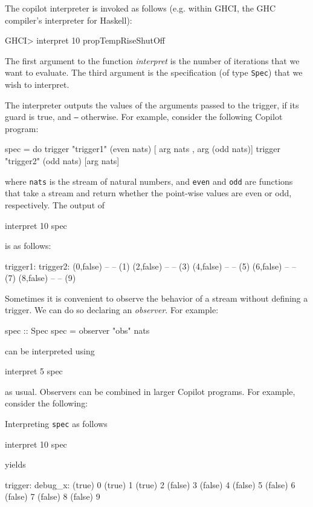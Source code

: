 The copilot interpreter is invoked as follows (e.g. within GHCI, the GHC compiler's
interpreter for Haskell):
%
\begin{code}
GHCI> interpret 10 propTempRiseShutOff
\end{code}
%
The first argument to the function \emph{interpret} is the number of iterations that we want to evaluate.
The third argument is the specification (of type {\tt Spec}) that we wish to interpret.

The interpreter outputs the values of the arguments passed to the trigger, if
its guard is true, and {\tt --} otherwise.  For example, consider the following
Copilot program:
%
\begin{code}
spec = do 
  trigger "trigger1" (even nats) [ arg nats
                                 , arg (odd nats)]
  trigger "trigger2" (odd nats) [arg nats]
\end{code}
where {\tt nats} is the stream of natural numbers, and {\tt even} and {\tt odd}
are functions that take a stream and return whether the point-wise values are
even or odd, respectively.  The output of 
%
\begin{code}
interpret 10 spec
\end{code}
%
is as follows:
%
\begin{code}
trigger1:   trigger2: 
(0,false)  --        
--         (1)       
(2,false)  --        
--         (3)       
(4,false)  --        
--         (5)       
(6,false)  --        
--         (7)       
(8,false)  --        
--         (9)     
\end{code}
%

Sometimes it is convenient to observe the behavior of a stream without defining
a trigger.  We can do so declaring an \emph{observer}.  For example:
%
\begin{code}
spec :: Spec
spec = observer "obs" nats  
\end{code}
%
can be interpreted using
%
\begin{code}
interpret 5 spec  
\end{code}
%
as usual.  Observers can be combined in larger Copilot programs.  For example,
consider the following:
%
Interpreting {\tt spec} as follows
%
\begin{code}
interpret 10 spec
\end{code}
%
yields
%
\begin{code}
trigger:  debug_x: 
(true)    0        
(true)    1        
(true)    2        
(false)   3        
(false)   4        
(false)   5        
(false)   6        
(false)   7        
(false)   8        
(false)   9        
\end{code}

